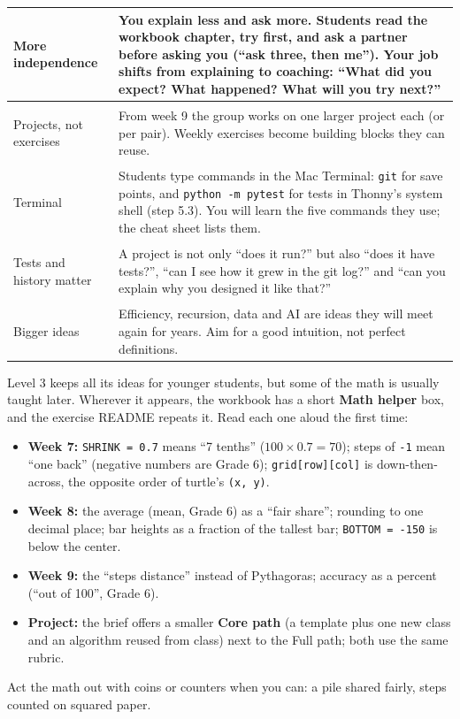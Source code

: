 \documentclass[level=3,teacher]{kidscode}
\begin{document}
\begin{tabularx}{\linewidth}{@{}>{\bfseries\raggedright\arraybackslash}p{3.2cm}X@{}}
\toprule
More independence & You explain less and ask more. Students read the workbook chapter, try
first, and ask a partner before asking you (\enquote{ask three, then me}). Your job shifts from
explaining to coaching: \enquote{What did you expect? What happened? What will you try next?}\\ \midrule
Projects, not exercises & From week 9 the group works on one larger project each (or per pair).
Weekly exercises become building blocks they can reuse.\\ \midrule
Terminal & Students type commands in the Mac Terminal: \texttt{git} for save points, and
\texttt{python -m pytest} for tests in Thonny's system shell (step 5.3). You will learn the five commands they use; the cheat
sheet lists them.\\ \midrule
Tests and history matter & A project is not only \enquote{does it run?} but also \enquote{does it
have tests?}, \enquote{can I see how it grew in the git log?} and \enquote{can you explain why you
designed it like that?}\\ \midrule
Bigger ideas & Efficiency, recursion, data and AI are ideas they will meet again for years. Aim
for a good intuition, not perfect definitions.\\
\bottomrule
\end{tabularx}

\begin{teachernote}
Level 3 keeps all its ideas for younger students, but some of the math is usually taught later.
Wherever it appears, the workbook has a short \textbf{Math helper} box, and the exercise README
repeats it. Read each one aloud the first time:
\begin{itemize}[itemsep=1pt]
  \item \textbf{Week 7:} \texttt{SHRINK = 0.7} means \enquote{7 tenths} ($100 \times 0.7 = 70$);
        steps of \texttt{-1} mean \enquote{one back} (negative numbers are Grade 6); \texttt{grid[row][col]}
        is down-then-across, the opposite order of turtle's \texttt{(x, y)}.
  \item \textbf{Week 8:} the average (mean, Grade 6) as a \enquote{fair share}; rounding to one
        decimal place; bar heights as a fraction of the tallest bar; \texttt{BOTTOM = -150} is below
        the center.
  \item \textbf{Week 9:} the \enquote{steps distance} instead of Pythagoras; accuracy as a
        percent (\enquote{out of 100}, Grade 6).
  \item \textbf{Project:} the brief offers a smaller \textbf{Core path} (a template plus one new
        class and an algorithm reused from class) next to the Full path; both use the same rubric.
\end{itemize}
Act the math out with coins or counters when you can: a pile shared fairly, steps counted on
squared paper.
\end{teachernote}
\end{document}
